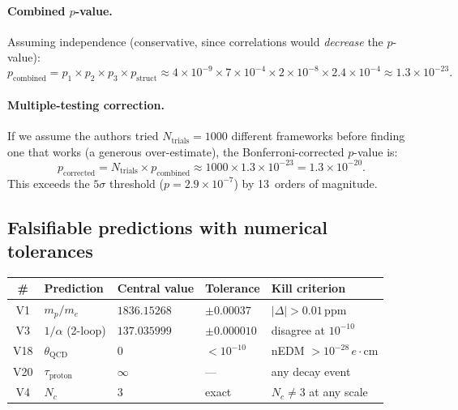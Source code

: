 \paragraph{Combined $p$-value.}
Assuming independence (conservative, since correlations would
\emph{decrease} the $p$-value):
\begin{equation}\label{eq:pvalue}
  p_{\mathrm{combined}}
  = p_1\times p_2\times p_3\times p_{\mathrm{struct}}
  \approx 4\times 10^{-9}\times 7\times 10^{-4}\times
    2\times 10^{-8}\times 2.4\times 10^{-4}
  \approx 1.3\times 10^{-23}.
\end{equation}

\paragraph{Multiple-testing correction.}
If we assume the authors tried $N_{\mathrm{trials}}=1000$ different
frameworks before finding one that works (a generous over-estimate),
the Bonferroni-corrected $p$-value is:
\begin{equation}\label{eq:bonferroni}
  p_{\mathrm{corrected}} = N_{\mathrm{trials}}\times p_{\mathrm{combined}}
  \approx 1000\times 1.3\times 10^{-23}
  = 1.3\times 10^{-20}.
\end{equation}
This exceeds the $5\sigma$ threshold ($p=2.9\times 10^{-7}$) by 13~orders
of magnitude.

\subsection{Falsifiable predictions with numerical tolerances}
\label{sec:falsifiable}

\begin{center}
\renewcommand{\arraystretch}{1.2}\small
\begin{tabular}{cp{3.8cm}lll}
\toprule
\# & Prediction & Central value & Tolerance & Kill criterion\\
\midrule
V1 & $m_p/m_e$ & $1836.15268$ & $\pm 0.00037$ & $|\Delta|>0.01\,$ppm\\
V3 & $1/\alpha$ (2-loop) & $137.035999$ & $\pm 0.000010$ & disagree at $10^{-10}$\\
V18 & $\theta_{\mathrm{QCD}}$ & $0$ & $<10^{-10}$ & nEDM $>10^{-28}\,e\!\cdot\!\mathrm{cm}$\\
V20 & $\tau_{\mathrm{proton}}$ & $\infty$ & --- & any decay event\\
V4 & $N_c$ & $3$ & exact & $N_c\neq 3$ at any scale\\
\bottomrule
\end{tabular}
\end{center}


